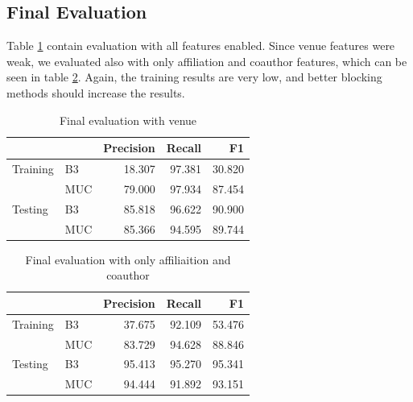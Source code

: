 \documentclass[twocolumn,letterpaper]{article}
\begin{document}
\subsection{Final Evaluation} %
\label{sub:final_evaluation}
Table \ref{tab:all} contain evaluation with all features enabled. Since venue features were weak, we evaluated also with only affiliation and coauthor features, which can be seen in table \ref{tab:some}. Again, the training results are very low, and better blocking methods should increase the results. 

\begin{table}[ht]
\centering
\begin{tabular}{l || l | r r r}
 & & Precision & Recall & F1 \\ \hline
Training & B3 & 18.307 & 97.381 & 30.820 \\
 & MUC & 79.000 & 97.934 & 87.454\\ \hline
Testing & B3 & 85.818 & 96.622 & 90.900 \\
 & MUC & 85.366 & 94.595 & 89.744 \\
\end{tabular}
\caption{Final evaluation with venue}
\label{tab:all}
\end{table}

\begin{table}[ht]
\centering
\begin{tabular}{l || l | r r r}
 & & Precision & Recall & F1 \\ \hline
Training & B3 & 37.675 & 92.109 & 53.476 \\
 & MUC & 83.729 & 94.628 & 88.846\\ \hline
Testing & B3 & 95.413 & 95.270 & 95.341\\
 & MUC & 94.444 & 91.892 & 93.151 \\
\end{tabular}
\caption{Final evaluation with only affiliaition and coauthor}
\label{tab:some}
\end{table}





\end{document}
